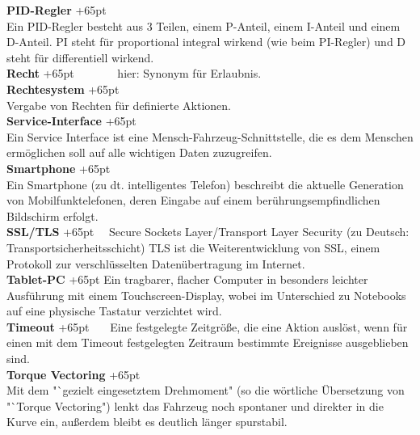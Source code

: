 \documentclass[fontsize = 12pt, paper = a4]{scrreprt}
\begin{document}
\textbf{PID-Regler}
\hangindent+65pt  \\
Ein PID-Regler besteht aus 3 Teilen, einem P-Anteil, einem I-Anteil und einem D-Anteil. PI steht für proportional integral wirkend (wie beim PI-Regler) und D steht für differentiell wirkend.\\

\textbf{Recht}
\hangindent+65pt  
\ \ \ \ \ \ \ hier: Synonym für Erlaubnis.\\

\textbf{Rechtesystem}
\hangindent+65pt  \\
Vergabe von Rechten für definierte Aktionen.\\

\textbf{Service-Interface}
\hangindent+65pt  \\
Ein Service Interface ist eine Mensch-Fahrzeug-Schnittstelle, die es dem Menschen ermöglichen soll auf alle wichtigen Daten zuzugreifen.\\

\textbf{Smartphone}
\hangindent+65pt  \\
Ein Smartphone (zu dt. intelligentes Telefon) beschreibt die aktuelle Gene\-ration von Mobilfunktelefonen, deren Eingabe auf einem berührungsempfindlichen Bildschirm erfolgt.\\

\textbf{SSL/TLS}
\hangindent+65pt  
\ \ Secure Sockets Layer/Transport Layer Security (zu Deutsch: Transportsicherheitsschicht) TLS ist die Weiterentwicklung von SSL, einem Protokoll zur verschlüsselten Datenübertragung im Internet.\\

\textbf{Tablet-PC}
\hangindent+65pt  
Ein tragbarer, flacher Computer in besonders leichter Ausführung mit einem Touchscreen-Display, wobei im Unterschied zu Notebooks auf eine physische Tastatur verzichtet wird.\\

\textbf{Timeout}
\hangindent+65pt  
\ \ \ Eine festgelegte Zeitgröße, die eine Aktion auslöst, wenn für einen mit dem Timeout festgelegten Zeitraum bestimmte Ereignisse ausgeblieben sind.\\

\textbf{Torque Vectoring}
\hangindent+65pt  \\
Mit dem "`gezielt eingesetztem Drehmoment" (so die wörtliche Übersetzung von "`Torque Vectoring") lenkt das Fahrzeug noch spontaner und direkter in die Kurve ein, außerdem bleibt es deutlich länger spurstabil.\\
\end{document}

